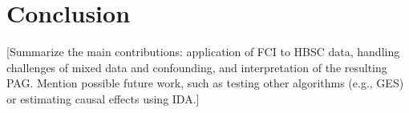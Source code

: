 \documentclass[main.tex]{subfiles}
\begin{document}
\section{Conclusion}


[Summarize the main contributions: application of FCI to HBSC data, handling challenges of mixed data and confounding, and interpretation of the resulting PAG. Mention possible future work, such as testing other algorithms (e.g., GES) or estimating causal effects using IDA.]
\end{document}

